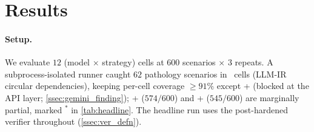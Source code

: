 \section{Results}
\label{sec:results}

\paragraph{Setup.}
We evaluate $12$ (model $\times$ strategy) cells at $600$ scenarios $\times$ $3$ repeats.
A subprocess-isolated runner caught $62$ pathology scenarios in \structured\ cells (LLM-IR circular dependencies), keeping per-cell coverage $\geq 91\%$ except \geminiflash + \structured (blocked at the API layer; \cref{ssec:gemini_finding}); \opus + \structured ($574/600$) and \gpt + \structured ($545/600$) are marginally partial, marked $^*$ in \cref{tab:headline}.
The headline run uses the post-hardened verifier throughout (\cref{ssec:ver_defn}).

